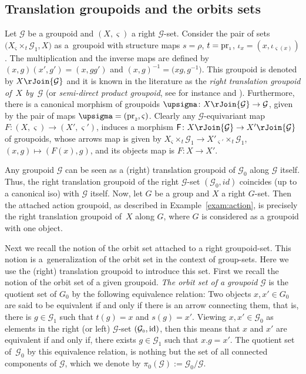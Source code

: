 \documentclass[10pt,a4paper]{amsart}
\numberwithin{equation}{section}
\newcommand{\Sf}[1]{\mathsf{#1}}
\newcommand{\Go}{\cG_{\Sscript{0}}}
\newcommand{\Ga}{\cG_{\Sscript{1}}}
\newcommand{\cG}{{\mathcal G}}
\newcommand{\Sscript}[1]{\scriptscriptstyle{#1}}
\newcommand{\due}[3]{{}_{{#2 }} {#1}_{{ #3}} }
\begin{document}
\begin{Example}
\end{Example}

\subsection{Translation groupoids and the orbits sets}\label{ssec:Grpd12}
 Let $\cG$ be a groupoid and $(X,\varsigma)$ a right $\cG$-set. Consider the pair of sets $\big( X \due \times {\Sscript{\varsigma}} { \Sscript{{t}}} \Ga, X \big)$ as a~groupoid with structure maps ${s}=\rho$, $t={\rm pr}_{\Sscript{1}}$, $\iota_{\Sscript{x}}=(x,\iota_{\varsigma(x)})$. The multiplication and the inverse maps are defined by $(x,g)(x',g')=(x,gg')$ and $(x,g)^{-1}=\big(xg,g^{-1}\big)$. This groupoid is denoted by $X \rJoin \cG$ and it is known in the literature as the \emph{right translation groupoid of~$X$ by~$\cG$} (or \emph{semi-direct product groupoid}, see for instance \cite[p.~163]{Moedijk/Mrcun:2005} and \cite{Kaoutit/Kowalzig:14}). Furthermore, there is a canonical morphism of groupoids $\upsigma\colon X\rJoin \cG \to \cG$, given by the pair of maps $\upsigma=({\rm pr}_{\Sscript{2}}, \varsigma)$. Clearly any $\cG$-equivariant map $F\colon (X,\varsigma) \to (X',\varsigma')$, induces a morphism $\Sf{F}\colon X \rJoin \cG \to X' \rJoin \cG$ of groupoids, whose arrows map is given by $X \due \times {\Sscript{\varsigma}} { \Sscript{{t}}} \Ga \to X' \due \times {\Sscript{\varsigma'}} { \Sscript{{t}}} \Ga $, $(x, g) \mapsto (F(x), g)$, and its objects map is $F\colon X \to X'$.

\begin{Example}\label{exam:refereePacience}Any groupoid $\cG$ can be seen as a (right) translation groupoid of $\Go$ along $\cG$ itself. Thus, the right translation groupoid of the right $\cG$-set $(\Go, id)$ coincides (up to a canonical iso) with $\cG$ itself. Now, let $G$ be a group and $X$ a right $G$-set. Then the attached action groupoid, as described in Example~\ref{exam:action}, is precisely the right translation groupoid of~$X$ along $G$, where $G$ is considered as a groupoid with one object.
\end{Example}

Next we recall the notion of the orbit set attached to a right groupoid-set. This notion is a~generalization of the orbit set in the context of group-sets. Here we use the (right) translation groupoid to introduce this set.
First we recall the notion of the orbit set of a given groupoid. \emph{The orbit set of a groupoid} $\cG$ is the quotient set of $G_{\Sscript{0}}$ by the following equivalence relation: Two objects $x, x' \in G_{\Sscript{0}}$ are said to be equivalent if and only if there is an arrow connecting them, that is, there is $g \in\Ga$ such that $t(g)=x$ and $s(g)=x'$. Viewing $x, x' \in \Go$ as elements in the right (or left) $\cG$-set $(\Go, {\rm id})$, then this means that $x$ and $x'$ are equivalent if and only if, there exists $g \in \Ga$ such that $x . g=x'$. The quotient set of~$\Go$ by this equivalence relation, is nothing but the set of all connected components of $\cG$, which we denote by $\pi_{\Sscript{0}}(\cG):=\Go/\cG$.
\end{document}
